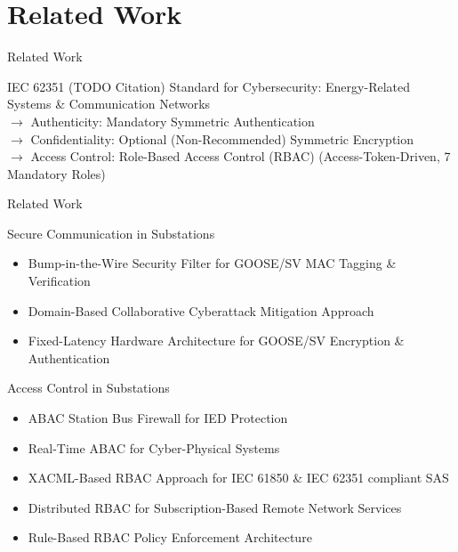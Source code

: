 \documentclass[en]{sdqbeamer}
\begin{document}
\section{Related Work}
\begin{frame}{Related Work}
    \begin{blueblock}{IEC 62351 (TODO Citation)}
        Standard for Cybersecurity: Energy-Related Systems \& Communication Networks
        \\$\rightarrow$ Authenticity: Mandatory Symmetric Authentication
        \\$\rightarrow$ Confidentiality: Optional (Non-Recommended) Symmetric Encryption
        \\$\rightarrow$ Access Control: Role-Based Access Control (RBAC) (Access-Token-Driven, 7 Mandatory Roles)
    \end{blueblock}
\end{frame}
\begin{frame}{Related Work}
    \begin{blueblock}{Secure Communication in Substations}
        \begin{itemize}
            \item Bump-in-the-Wire Security Filter for GOOSE/SV MAC Tagging \& Verification \parencite{Ishchenko2018}
            \item Domain-Based Collaborative Cyberattack Mitigation Approach \parencite{Hong2019}
            \item Fixed-Latency Hardware Architecture for GOOSE/SV Encryption \& Authentication \parencite{Rodriguez2021}
        \end{itemize}
    \end{blueblock}

    \begin{blueblock}{Access Control in Substations}
        \begin{itemize}
            \item ABAC Station Bus Firewall for IED Protection \parencite{Ruland2018}
            \item Real-Time ABAC for Cyber-Physical Systems \parencite{Burmester2013}
            \item XACML-Based RBAC Approach for IEC 61850 \& IEC 62351 compliant SAS \parencite{Lee2015}
            \item Distributed RBAC for Subscription-Based Remote Network Services \parencite{Ma2006} %
            \item Rule-Based RBAC Policy Enforcement Architecture \parencite{Alcaraz2016} %
        \end{itemize}
    \end{blueblock}
\end{frame}
\end{document}
